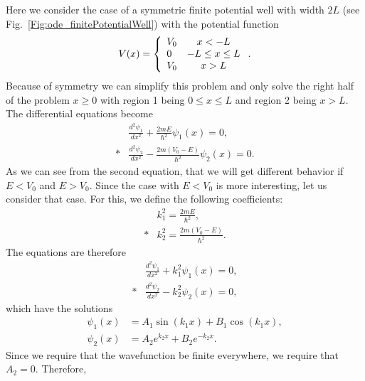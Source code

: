 Here we consider the case of a symmetric finite potential well with width $2L$ (see Fig.~\ref{Fig:ode_finitePotentialWell}) with the potential function
\begin{align}
  V(x) = \left\{ \begin{array}{l c} V_0 & x < -L \\ 0 & -L \le x \le L \\ V_0 & x > L \end{array} \right. .
\end{align}
Because of symmetry we can simplify this problem and only solve the right half of the problem $x \ge 0$ with region 1 being $0 \le x \le L$ and region 2 being $x > L$.  The differential equations become
\begin{subequations}
\begin{align}
  &\frac{d^2 \psi_1}{dx^2} + \frac{2mE}{\hbar^2} \psi_1(x) = 0, \\*
  &\frac{d^2 \psi_2}{dx^2} - \frac{2m(V_0 - E)}{\hbar^2} \psi_2(x) = 0.
\end{align}
\end{subequations}
As we can see from the second equation, that we will get different behavior if $E < V_0$ and $E > V_0$. Since the case with $E < V_0$ is more interesting, let us consider that case. For this, we define the following coefficients:
\begin{subequations}
\begin{align}
  &k_1^2 = \frac{2mE}{\hbar^2}, \\*
  &k_2^2 = \frac{2m(V_0 - E)}{\hbar^2}.
\end{align}
\end{subequations}
The equations are therefore
\begin{subequations}
\begin{align}
  &\frac{d^2 \psi_1}{dx^2} + k_1^2 \psi_1(x) = 0, \\*
  &\frac{d^2 \psi_2}{dx^2} - k_2^2 \psi_2(x) = 0, 
\end{align}
\end{subequations}
which have the solutions
\begin{subequations}
\begin{align}
  \psi_1(x) &= A_1 \sin ( k_1 x ) + B_1 \cos ( k_1 x ), \\
  \psi_2(x) &= A_2 e^{k_2 x} + B_2 e^{-k_2 x} .
\end{align}
\end{subequations}
Since we require that the wavefunction be finite everywhere, we require that $A_2 = 0$. Therefore,
